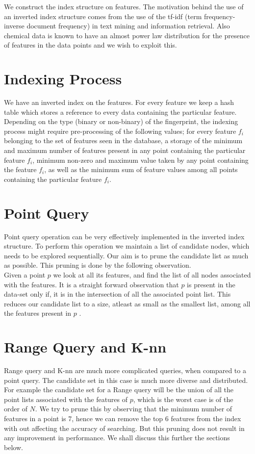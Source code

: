 
We construct the index structure on features. The motivation behind the use of an inverted index structure comes from the use of the tf-idf (term frequency-inverse document frequency) in text mining and information retrieval. Also chemical data is known to have an almost power law distribution for the presence of features in the data points and we wish to exploit this.


\section{Indexing Process}

We have an inverted index on the features. For every feature we keep a hash table which stores a reference to every data containing the particular feature. Depending on the type (binary or non-binary) of the fingerprint, the indexing process might require pre-processing of the following values; for every feature $f_i$ belonging to the set of features seen in the database, a storage of the minimum and maximum number of features present in any point containing the particular feature $f_i$, minimum non-zero and maximum value taken by any point containing the feature $f_i$, as well as the minimum sum of feature values among all points containing the particular feature $f_i$.

\section{Point Query}

Point query operation can be very effectively 
implemented in the inverted index structure. To perform this operation we maintain a list of candidate nodes, which needs to be explored sequentially. Our aim is to prune the candidate list as much as possible. This pruning is done by the following observation.\\
Given a point $p$ we look at all its features, and find the list of all nodes associated with the features. It is a straight forward observation that $p$ is present in the data-set only if, it is in the intersection of all the associated point list. This reduces our candidate list to a size, atleast as small as the smallest list, among all the features present in $p$ .\\

\section{Range Query and K-nn}
Range query and K-nn are much more complicated queries, when compared to a point query. The candidate set in this case is much more diverse and distributed. For example the candidate set for a Range query will be the union of all the point lists associated with the features of $p$, which is the worst case is of the order of $N$. We try to prune this by observing that the minimum number of features in a point is 7, hence we can remove the top 6 features from the index with out affecting the accuracy of searching. But this pruning does not result in any improvement in performance. We shall discuss this further the sections below.\\



